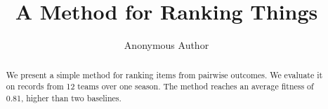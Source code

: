 \documentclass[11pt]{article}
\title{A Method for Ranking Things}
\author{Anonymous Author}
\date{}
\begin{document}
\maketitle

\begin{abstract}
We present a simple method for ranking items from pairwise outcomes.
We evaluate it on records from 12 teams over one season.
The method reaches an average fitness of 0.81, higher than two baselines.
\end{abstract}







\end{document}
